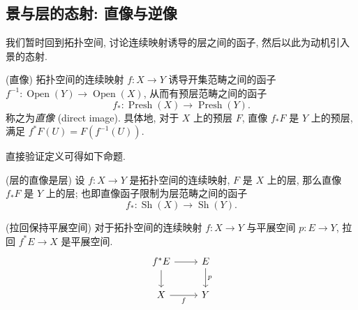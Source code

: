 \subsection{景与层\topos{}的态射: 直像与逆像}

我们暂时回到拓扑空间,
讨论连续映射诱导的层\topos{}之间的函子,
然后以此为动机引入景的态射.


\begin{definition}
	{(直像)}
	拓扑空间的连续映射 $f\colon X \to Y$ 诱导开集范畴之间的函子 $f^{-1} \colon \operatorname{Open}(Y) \to \operatorname{Open}(X)$,
	从而有预层范畴之间的函子
	$$
	f_* \colon \operatorname{Presh}(X) \to \operatorname{Presh}(Y).
	$$
	称之为\emph{直像} (direct image). 具体地, 对于 $X$ 上的预层 $F$,
	直像 $f_*F$ 是 $Y$ 上的预层, 满足 $f^*F(U) = F(f^{-1}(U))$.
\end{definition}

直接验证定义可得如下命题.

\begin{prop}
	{(层的直像是层)}
	设 $f\colon X\to Y$ 是拓扑空间的连续映射, $F$ 是 $X$ 上的层, 那么直像 $f_*F$ 是 $Y$ 上的层; 也即直像函子限制为层范畴之间的函子
	$$
	f_* \colon \operatorname{Sh}(X) \to \operatorname{Sh}(Y).
	$$
\end{prop}


\begin{prop}
	{(拉回保持平展空间)}
	对于拓扑空间的连续映射 $f\colon X \to Y$ 与平展空间 $p \colon E \to Y$, 拉回 $f^*E \to X$ 是平展空间.
	\[\begin{tikzcd}[ampersand replacement=\&]
		{f^*E} \& E \\
		X \& Y
		\arrow["f"', from=2-1, to=2-2]
		\arrow["p", from=1-2, to=2-2]
		\arrow[from=1-1, to=2-1]
		\arrow[from=1-1, to=1-2]
	\end{tikzcd}\]
\end{prop}

